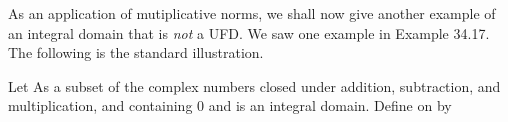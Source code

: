 \documentclass[11pt,oneside]{article}
\begin{document}
\begin{BookBody}
As an application of mutiplicative norms, we shall now give another example of an integral domain that is\textit{ not} a UFD. We saw one example in Example 34.17. The following is the standard illustration.

 Let  As a subset of the complex numbers closed under addition, subtraction, and multiplication, and containing 0 and  is an integral 
domain. Define  on  by

\end{BookBody}

\BookNarrativetrue
\end{document}
